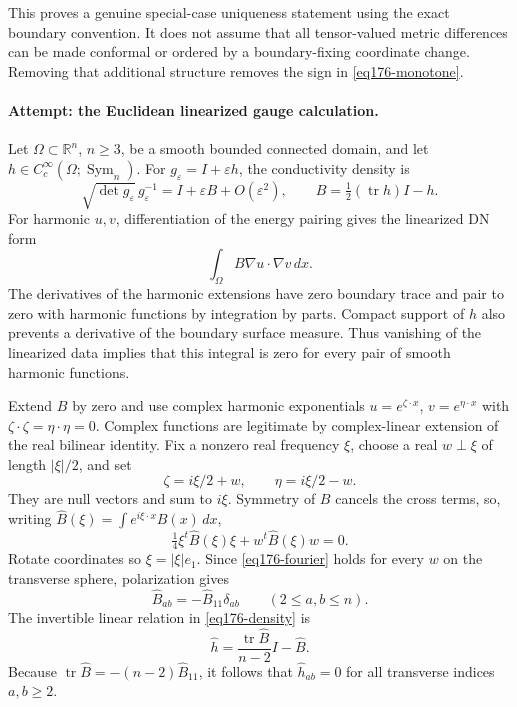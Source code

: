 \documentclass[11pt,a4paper]{article}
\newcommand{\R}{\mathbb{R}}
\newcommand{\eps}{\varepsilon}
\numberwithin{equation}{section}
\begin{document}
This proves a genuine special-case uniqueness statement using the exact
boundary convention. It does not assume that all tensor-valued metric
differences can be made conformal or ordered by a boundary-fixing
coordinate change. Removing that additional structure removes the sign
in \eqref{eq176-monotone}.

\paragraph{Attempt: the Euclidean linearized gauge calculation.}
Let $\Omega\subset\R^n$, $n\ge3$, be a smooth bounded connected domain,
and let $h\in C_c^\infty(\Omega;\operatorname{Sym}_n)$.
For $g_\eps=I+\eps h$, the conductivity density is
\begin{equation}\label{eq176-density}
 \sqrt{\det g_\eps}\,g_\eps^{-1}
   =I+\eps B+O(\eps^2),\qquad
 B=\tfrac12(\operatorname{tr}h)I-h.
\end{equation}
For harmonic $u,v$, differentiation of the energy pairing gives the
linearized DN form
\[
                       \int_\Omega B\nabla u\cdot\nabla v\,dx.
\]
The derivatives of the harmonic extensions have zero boundary trace and
pair to zero with harmonic functions by integration by parts. Compact
support of $h$ also prevents a derivative of the boundary surface measure.
Thus vanishing of the linearized data implies that this integral is zero
for every pair of smooth harmonic functions.

Extend $B$ by zero and use complex harmonic exponentials
$u=e^{\zeta\cdot x}$, $v=e^{\eta\cdot x}$ with
$\zeta\cdot\zeta=\eta\cdot\eta=0$. Complex functions are legitimate by
complex-linear extension of the real bilinear identity. Fix a nonzero real
frequency $\xi$, choose a real $w\perp\xi$ of length $|\xi|/2$, and set
\[
 \zeta=i\xi/2+w,\qquad \eta=i\xi/2-w.
\]
They are null vectors and sum to $i\xi$. Symmetry of $B$ cancels the cross
terms, so, writing $\widehat B(\xi)=\int e^{i\xi\cdot x}B(x)\,dx$,
\begin{equation}\label{eq176-fourier}
      \tfrac14\xi^t\widehat B(\xi)\xi+
                           w^t\widehat B(\xi)w=0.
\end{equation}
Rotate coordinates so $\xi=|\xi|e_1$. Since \eqref{eq176-fourier} holds
for every $w$ on the transverse sphere, polarization gives
\[
 \widehat B_{ab}=-\widehat B_{11}\delta_{ab}
                       \qquad(2\le a,b\le n).
\]
The invertible linear relation in \eqref{eq176-density} is
\[
 \widehat h=\frac{\operatorname{tr}\widehat B}{n-2}I-\widehat B.
\]
Because $\operatorname{tr}\widehat B=-(n-2)\widehat B_{11}$, it follows
that $\widehat h_{ab}=0$ for all transverse indices $a,b\ge2$.
\end{document}
